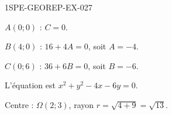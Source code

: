 \begin{corrige}{1SPE-GEOREP-EX-027}


$A(0 ; 0)$ : $C = 0$.

$B(4 ; 0)$ : $16 + 4A = 0$, soit $A = -4$.

$C(0 ; 6)$ : $36 + 6B = 0$, soit $B = -6$.

L'équation est $x^2 + y^2 - 4x - 6y = 0$.

Centre : $\Omega(2 ; 3)$, rayon $r = \sqrt{4 + 9} = \sqrt{13}$.

\end{corrige}
